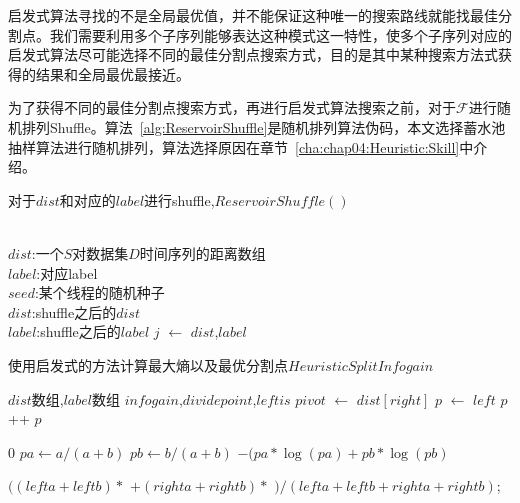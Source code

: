 启发式算法寻找的不是全局最优值，并不能保证这种唯一的搜索路线就能找最佳分割点。我们需要利用多个子序列能够表达这种模式这一特性，使多个子序列对应的启发式算法尽可能选择不同的最佳分割点搜索方式，目的是其中某种搜索方法式获得的结果和全局最优最接近。

为了获得不同的最佳分割点搜索方式，再进行启发式算法搜索之前，对于$\mathcal{F}$进行随机排列Shuffle。算法~\ref{alg:ReservoirShuffle}是随机排列算法伪码，本文选择蓄水池抽样算法进行随机排列，算法选择原因在章节~\ref{cha:chap04:Heuristic:Skill}中介绍。

\begin{algorithm}
	\caption{对于$dist$和对应的$label$进行shuffle,$ReservoirShuffle()$}
	\label{alg:ReservoirShuffle}
	\begin{algorithmic}[1]
		\Require ~~\\
		$dist$:一个{\color{red}{候选序列}}$S$对数据集$D$时间序列的距离数组\\
		$label$:对应label\\
		$seed$:某个线程的随机种子
		\Ensure ~~\\
		$dist$:shuffle之后的$dist$\\
		$label$:shuffle之后的$label$
				\State $j$ $\gets$ 
					\State {}
					\State {}
				\EndIf
			\EndFor
			\State \Return $dist$,$label$
		\EndFunction
	\end{algorithmic}
\end{algorithm}

\begin{algorithm}
	\caption{使用启发式的方法计算最大熵以及最优分割点$HeuristicSplitInfogain${\color{red}{这个伪代码检查一下0和1,可能需要重新设计}}}
	\label{alg:HeuristicSplitInfogain}
	\begin{algorithmic}[1]
	\Require $dist$数组,$label$数组
	\Ensure $infogain$,$dividepoint$,$leftis$
		\State $pivot$ $\gets$ $dist[right]$
		\State $p$ $\gets$ $left$
				\State {}
				\State {}
				\State $p$ ++
			\EndIf
		\EndFor
		\State {}
		\State \Return $p$
	\EndFunction
	
			\Return $0$
		\EndIf
		\State $pa \gets a/(a+b)$
		\State $pb \gets b/(a+b)$
		\State \Return $-(pa*\log(pa)+pb*\log(pb)$
	\EndFunction
	
		\State \Return $((lefta + leftb)*$ $+(righta+rightb)*$  $)/(lefta+leftb+righta+rightb)$;
 	\EndFunction
	\end{algorithmic}
\end{algorithm}

